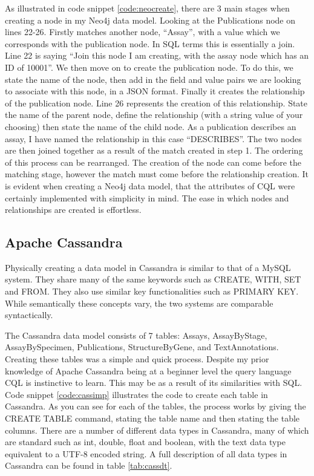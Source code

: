 As illustrated in code snippet \ref{code:neocreate}, there are 3 main stages when creating a node in my Neo4j data model. Looking at the Publications node on lines 22-26. Firstly matches another node, ``Assay'', with a value which we corresponds with the publication node. In SQL terms this is essentially a join. Line 22 is saying ``Join this node I am creating, with the assay node which has an ID of 10001''. We then move on to create the publication node. To do this, we state the name of the node, then add in the field and value pairs we are looking to associate with this node, in a JSON format. Finally it creates the relationship of the publication node. Line 26 represents the creation of this relationship. State the name of the parent node, define the relationship (with a string value of your choosing) then state the name of the child node. As a publication describes an assay, I have named the relationship in this case ``DESCRIBES''. The two nodes are then joined together as a result of the match created in step 1. The ordering of this process can be rearranged. The creation of the node can come before the matching stage, however the match must come before the relationship creation. It is evident when creating a Neo4j data model, that the attributes of CQL were certainly implemented with simplicity in mind. The ease in which nodes and relationships are created is effortless.

\subsection{Apache Cassandra}\label{cassandraimplementation}
Physically creating a data model in Cassandra is similar to that of a MySQL system. They share many of the same keywords such as CREATE, WITH, SET and FROM. They also use similar key functionalities such as PRIMARY KEY. While semantically these concepts vary, the two systems are comparable syntactically.

The Cassandra data model consists of 7 tables: Assays, AssayByStage, AssayBySpecimen, Publications, StructureByGene, and TextAnnotations. Creating these tables was a simple and quick process. Despite my prior knowledge of Apache Cassandra being at a beginner level the query language CQL is instinctive to learn. This may be as a result of its similarities with SQL. Code snippet \ref{code:cassimp} illustrates the code to create each table in Cassandra. As you can see for each of the tables, the process works by giving the CREATE TABLE command, stating the table name and then stating the table columns. There are a number of different data types in Cassandra, many of which are standard such as int, double, float and boolean, with the text data type equivalent to a UTF-8 encoded string. A full description of all data types in Cassandra can be found in table \ref{tab:cassdt}.

